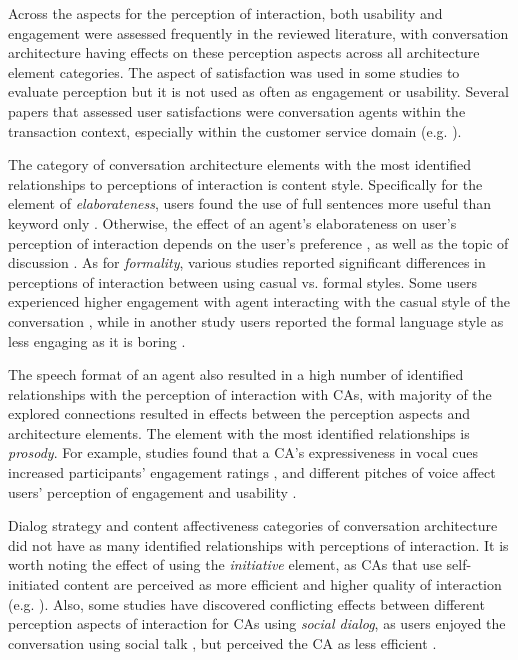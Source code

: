 Across the aspects for the perception of interaction, both usability and engagement were assessed frequently in the reviewed literature, with conversation architecture having effects on these perception aspects across all architecture element categories. The aspect of satisfaction was used in some studies to evaluate perception but it is not used as often as engagement or usability. Several papers that assessed user satisfactions were conversation agents within the transaction context, especially within the customer service domain (e.g. \cite{diederich2019emulating}\cmt{[25]}\cite{elsholz2019exploring}\cmt{[61]}\cite{gnewuch2018faster}\cmt{[19]}).

The category of conversation architecture elements with the most identified relationships to perceptions of interaction is content style. Specifically for the element of \textit{elaborateness}, users found the use of full sentences more useful than keyword only \cite{haas2022keep}\cmt{[78]}\cite{roy2021users}\cmt{[71]}. Otherwise, the effect of an agent's elaborateness on user's perception of interaction depends on the user's preference \cite{miehle2018exploring}\cmt{[51]}, as well as the topic of discussion \cite{haas2022keep}\cmt{[78]}. As for \textit{formality}, various studies reported significant differences in perceptions of interaction between using casual vs. formal styles. Some users experienced higher engagement with agent interacting with the casual style of the conversation \cite{cox2022does}\cmt{[27]}, while in another study users reported the formal language style as less engaging as it is boring \cite{kim2019comparing}\cmt{[89]}.

The speech format of an agent also resulted in a high number of identified relationships with the perception of interaction with CAs, with majority of the explored connections resulted in effects between the perception aspects and architecture elements. The element with the most identified relationships is \textit{prosody}. For example, studies found that a CA's expressiveness in vocal cues increased participants' engagement ratings \cite{zhu2022effects}\cmt{[26]}, and different pitches of voice affect users' perception of engagement and usability \cite{chan2021kinvoices}\cmt{[74]}\cite{habler2019effects}\cmt{[63]}.

Dialog strategy and content affectiveness categories of conversation architecture did not have as many identified relationships with perceptions of interaction. It is worth noting the effect of using the \textit{initiative} element, as CAs that use self-initiated content are perceived as more efficient and higher quality of interaction (e.g. \cite{cuadra2021my}\cmt{[67]}). Also, some studies have discovered conflicting effects between different perception aspects of interaction for CAs using \textit{social dialog}, as users enjoyed the conversation using social talk \cite{lee2020hear}\cmt{[23]}\cite{roy2021users}\cmt{[71]}, but perceived the CA as less efficient \cite{roy2021users}\cmt{[71]}.

